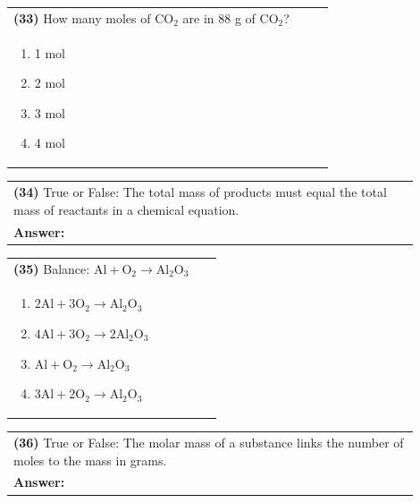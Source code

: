 \documentclass{article}
\begin{document}
{\vspace{0.2cm}
\noindent \begin{tabular}{|p{0.9\linewidth}|}
\hline
\vspace{0.2cm}
\textbf{(33)} How many moles of $\mathrm{CO_2}$ are in 88 g of $\mathrm{CO_2}$?\\
\begin{minipage}[t]{0.85\linewidth}
\begin{enumerate}[label=\alph*.]
\item 1 mol
\item 2 mol
\item 3 mol
\item 4 mol
\end{enumerate}
\end{minipage}\\
\hline
\end{tabular}

\vspace{0.2cm}
\noindent \begin{tabular}{|p{0.9\linewidth}|}
\hline
\vspace{0.2cm}
\textbf{(34)} True or False: The total mass of products must equal the total mass of reactants in a chemical equation.\\
\textbf{Answer:} \underline{\hspace{2cm}}\\
\hline
\end{tabular}

\vspace{0.2cm}
\noindent \begin{tabular}{|p{0.9\linewidth}|}
\hline
\vspace{0.2cm}
\textbf{(35)} Balance: $\mathrm{Al + O_2 \rightarrow Al_2O_3}$\\
\begin{minipage}[t]{0.85\linewidth}
\begin{enumerate}[label=\alph*.]
\item $\mathrm{2Al + 3O_2 \rightarrow Al_2O_3}$
\item $\mathrm{4Al + 3O_2 \rightarrow 2Al_2O_3}$
\item $\mathrm{Al + O_2 \rightarrow Al_2O_3}$
\item $\mathrm{3Al + 2O_2 \rightarrow Al_2O_3}$
\end{enumerate}
\end{minipage}\\
\hline
\end{tabular}

\vspace{0.2cm}
\noindent \begin{tabular}{|p{0.9\linewidth}|}
\hline
\vspace{0.2cm}
\textbf{(36)} True or False: The molar mass of a substance links the number of moles to the mass in grams.\\
\textbf{Answer:} \underline{\hspace{2cm}}\\
\hline
\end{tabular}
\newpage

}
\end{document}
